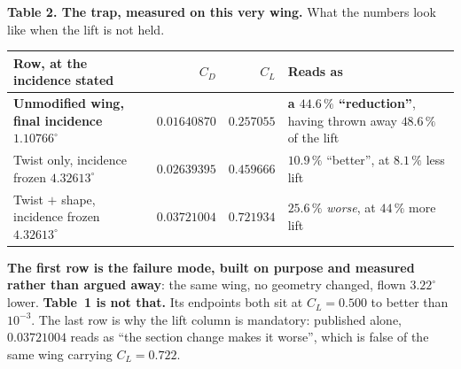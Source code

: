 \documentclass[9pt,a4paper]{article}
\renewcommand{\scriptsize}{\fontsize{5.7}{6.1}\selectfont}
\begin{document}
\begin{minipage}[t]{0.545\textwidth}
\vspace{3pt}
\textbf{Table 2. The trap, measured on this very wing.}
What the numbers look like when the lift is not held.

\vspace{1.5pt}
{\fontsize{6.7}{7.9}\selectfont
\begin{tabular}{@{}>{\raggedright\arraybackslash}p{30mm} r r >{\raggedright\arraybackslash}p{27mm}@{}}
\toprule
Row, at the incidence stated & $C_D$ & $C_L$ & Reads as \\
\midrule
\textbf{Unmodified wing, final incidence $1.10766^\circ$}
  & $\mathbf{0.01640870}$ & $\mathbf{0.257055}$
  & \textcolor{warm}{\textbf{a $44.6\,\%$ ``reduction''}}, having thrown away $48.6\,\%$ of the lift \\
\midrule
Twist only, incidence frozen $4.32613^\circ$   & $0.02639395$ & $0.459666$ & $10.9\,\%$ ``better'', at $8.1\,\%$ less lift \\
Twist $+$ shape, incidence frozen $4.32613^\circ$ & $0.03721004$ & $0.721934$ & $25.6\,\%$ \emph{worse}, at $44\,\%$ more lift \\
\bottomrule
\end{tabular}}

\vspace{1.5pt}
{\scriptsize \textbf{The first row is the failure mode, built on purpose
and measured rather than argued away}: the same wing, no geometry changed,
flown $3.22^\circ$ lower. \textbf{Table~1 is not that.} Its endpoints both sit
at $C_L=0.500$ to better than $10^{-3}$. The last row is why the lift column is
mandatory: published alone, $0.03721004$ reads as ``the section change makes it
worse'', which is false of the same wing carrying $C_L=0.722$.}

\end{minipage}\hfill
\end{document}

